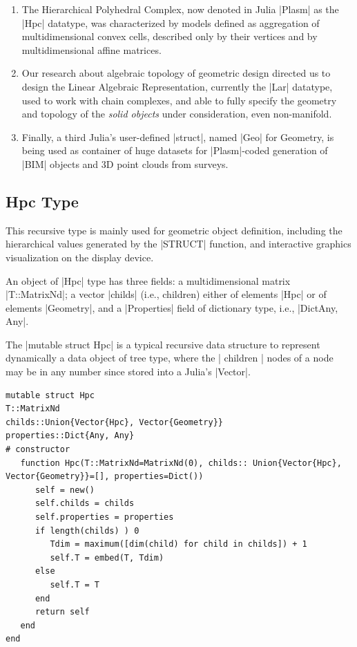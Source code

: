 \begin{enumerate}
\item 
The Hierarchical Polyhedral Complex, now denoted in Julia |Plasm| as the |Hpc| datatype, was characterized by models defined as aggregation of multidimensional convex cells, described only by their vertices and by multidimensional affine matrices.

\item 
Our research about algebraic topology of geometric design directed us to design the Linear Algebraic Representation, currently the |Lar| datatype, used to work with chain complexes, and able to  fully specify the geometry and topology of the \emph{solid objects} under consideration, even non-manifold.

\item 
Finally, a third Julia’s user-defined |struct|, named |Geo| for Geometry, is being used as container of huge datasets for |Plasm|-coded generation of |BIM| objects and 3D point clouds from surveys.  
\end{enumerate}


\subsection*{Hpc Type}\label{sect:4-1-1}

This recursive type is mainly used for geometric object definition, including the hierarchical values generated by the |STRUCT| function, and interactive graphics visualization on the display device.

An object of |Hpc| type has three fields: a multidimensional matrix |T::MatrixNd|; a vector |childs| (i.e., children) either of elements |Hpc| or of elements |Geometry|, and a |Properties| field of dictionary type, i.e., |Dict{Any, Any}|.

The |mutable struct Hpc| is a typical recursive data structure to represent dynamically a data object of tree type, where the | children | nodes of a node may be in any number since stored into a Julia’s |Vector|.

\begin{lstlisting}[language=JuliaLocal, style=julia, mathescape = true] 
mutable struct Hpc
T::MatrixNd
childs::Union{Vector{Hpc}, Vector{Geometry}}
properties::Dict{Any, Any}
# constructor
   function Hpc(T::MatrixNd=MatrixNd(0), childs:: Union{Vector{Hpc}, Vector{Geometry}}=[], properties=Dict())
      self = new()
      self.childs = childs
      self.properties = properties
      if length(childs) ) 0
         Tdim = maximum([dim(child) for child in childs]) + 1
         self.T = embed(T, Tdim)
      else
         self.T = T
      end
      return self
   end
end
\end{lstlisting}




